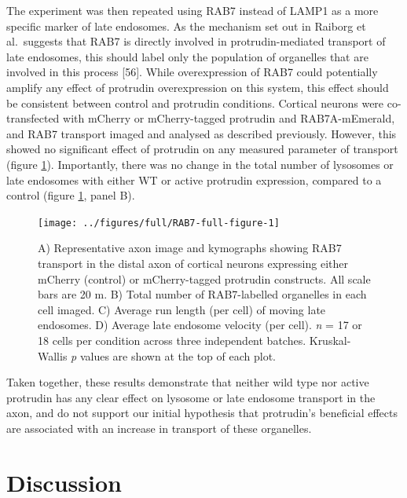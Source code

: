 \documentclass[
  12pt,
  a4paper,
]{book}
\begin{document}
The experiment was then repeated using RAB7 instead of LAMP1 as a more specific marker of late endosomes. As the mechanism set out in Raiborg et al.~suggests that RAB7 is directly involved in protrudin-mediated transport of late endosomes, this should label only the population of organelles that are involved in this process {[}56{]}. While overexpression of RAB7 could potentially amplify any effect of protrudin overexpression on this system, this effect should be consistent between control and protrudin conditions. Cortical neurons were co-transfected with mCherry or mCherry-tagged protrudin and RAB7A-mEmerald, and RAB7 transport imaged and analysed as described previously. However, this showed no significant effect of protrudin on any measured parameter of transport (figure \ref{fig:RAB7-full-figure}). Importantly, there was no change in the total number of lysosomes or late endosomes with either WT or active protrudin expression, compared to a control (figure \ref{fig:RAB7-full-figure}, panel B).



\begin{figure}
\texttt{[image: ../figures/full/RAB7-full-figure-1]} \caption[Protrudin effect on late endosome (RAB7) transport in the distal axon]{A) Representative axon image and kymographs showing RAB7 transport in the distal axon of cortical neurons expressing either mCherry (control) or mCherry-tagged protrudin constructs. All scale bars are 20 \textmu{}m. B) Total number of RAB7-labelled organelles in each cell imaged. C) Average run length (per cell) of moving late endosomes. D) Average late endosome velocity (per cell). \emph{n} = 17 or 18 cells per condition across three independent batches. Kruskal-Wallis \emph{p} values are shown at the top of each plot.}\label{fig:RAB7-full-figure}
\end{figure}

Taken together, these results demonstrate that neither wild type nor active protrudin has any clear effect on lysosome or late endosome transport in the axon, and do not support our initial hypothesis that protrudin's beneficial effects are associated with an increase in transport of these organelles.

\hypertarget{no-FYCO}{%
\section{Discussion}\label{no-FYCO}}
\end{document}
